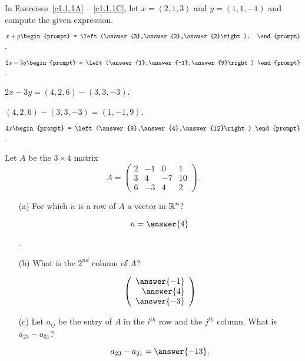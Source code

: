 \documentclass{ximera}
\begin{document}
\noindent In Exercises~\ref{c1.1.1A} -- \ref{c1.1.1C}, let $x=(2,1,3)$ and 
$y=(1,1,-1)$ and compute the given expression.
\begin{exercise}  \label{c1.1.1A}
  $x+y\begin{prompt}
    = \left(\answer{3},\answer{2},\answer{2}\right).
  \end{prompt}$.
\end{exercise}
\begin{exercise}  \label{c1.1.1B}
  $2x-3y\begin{prompt}
    = \left(\answer{1},\answer{-1},\answer{9}\right)
  \end{prompt}$.
  \begin{hint}
    $2x - 3y = (4,2,6) - (3,3,-3)$.
  \end{hint}
  \begin{hint}
    $(4,2,6) - (3,3,-3) = (1,-1,9)$.
  \end{hint}  
\end{exercise}
\begin{exercise}  \label{c1.1.1C}
  $4x\begin{prompt}
    = \left(\answer{8},\answer{4},\answer{12}\right)
    \end{prompt}$.
\end{exercise}

\begin{exercise} \label{c1.1.2}
Let $A$ be the $3\times 4$ matrix
\[
A=\left(\begin{array}{rrrr} 2 & -1 & 0 & 1 \\ 3 & 4 & -7 & 10\\
        6 & -3 & 4 & 2 \end{array}\right).
\]
\begin{enumerate}
\item[(a)]  For which $n$ is a row of $A$ a vector in $\mbox{$\Bbb{R}$}^n$? \begin{prompt}\[n = \answer{4}\]\end{prompt}.
\item[(b)]  What is the $2^{nd}$ column of $A$?
  \begin{prompt}
    \[
      \left(\begin{array}{r} \answer{-1} \\ \answer{4} \\ \answer{-3} \end{array} \right)
    \]
  \end{prompt}
\item[(c)] Let $a_{ij}$ be the entry of $A$ in the $i^{th}$ row
  and the $j^{th}$ column.  What is $a_{23}-a_{31}$?
  \begin{prompt}
    \[
      a_{23}-a_{31} = \answer{-13}.
    \]
  \end{prompt}
\end{enumerate}
\end{exercise}
\end{document}
